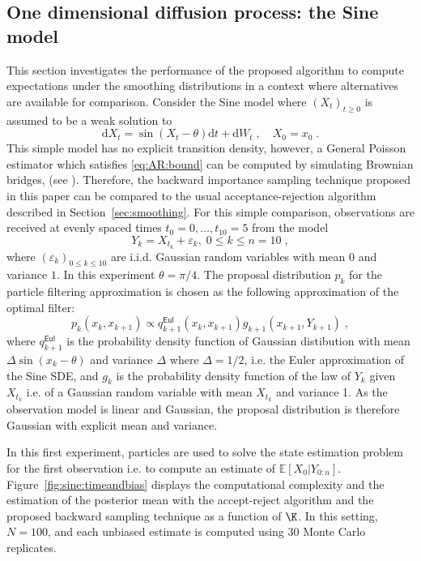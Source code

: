 \documentclass[12pt]{article}
\def\pE{\mathbb{E}}
\newcommand{\rmd}{\ensuremath{\mathrm{d}}}
\newcommand{\eqsp}{\;}
\begin{document}
\subsection{One dimensional diffusion process: the Sine model}
\label{sec:simu:SINE}
This section investigates the performance of the proposed algorithm to compute  expectations under the smoothing distributions in a context where  alternatives are available for comparison. Consider the Sine model where $(X_t)_{t\geqslant 0}$ is assumed to be a weak solution to
$$
\rmd X_t = \sin(X_t-\theta)\rmd t + \rmd W_t\eqsp,\quad X_0 = x_0\eqsp.
$$
This simple model has no explicit transition density, however, a General Poisson estimator which satisfies \eqref{eq:AR:bound} can be computed by simulating Brownian bridges, (see \cite{beskos2006exact}). 
Therefore, the backward importance sampling technique proposed in this paper can be compared to the usual acceptance-rejection algorithm described in Section~\ref{sec:smoothing}. 
For this simple comparison, observations are received at evenly spaced times $t_0=0,\ldots, t_{10} = 5$ from the model
\begin{equation}
\label{eq:obs:model:SINE}
Y_k=X_{t_k}+\varepsilon_k,\eqsp 0\leqslant k \leqslant n = 10\eqsp,
\end{equation}
where $(\varepsilon_k)_{0 \leqslant k\leqslant 10}$ are i.i.d. Gaussian random variables with mean $0$ and variance $1$. In this experiment $\theta = \pi/4$. 
The proposal distribution $p_k$ for the particle filtering approximation is chosen as the following approximation of the optimal filter:
\begin{equation}
\label{eq:optimal:filter}
p_{k}(x_{k},x_{k+1})\!\propto\! q^{\mathsf{Eul}}_{k+1}(x_{k},x_{k+1})g_{k+1}(x_{k+1},Y_{k+1})\eqsp,
\end{equation}
where $q^{\mathsf{Eul}}_{k+1}$ is the probability density function of Gaussian distibution with mean $\Delta \sin(x_k-\theta)$ and variance $\Delta$ where $\Delta = 1/2$, i.e. the Euler approximation of the Sine SDE, and $g_k$ is the probability density function of the law of $Y_k$ given $X_{t_k}$ i.e. of a Gaussian random variable with mean $X_{t_k}$ and variance 1. 
As the observation model is linear and Gaussian, the proposal distribution is therefore Gaussian with explicit mean and variance. 

In this first experiment, particles are used to solve the state estimation problem for the first observation i.e. to compute an estimate of $ \pE[ X_{0} | Y_{0:n}]$.
Figure~\ref{fig:sine:timeandbias} displays the computational complexity and the estimation of the posterior mean with the accept-reject algorithm and the proposed backward sampling technique as a function of $\K$. 
In this setting, $N=100$, and each unbiased estimate is computed using 30 Monte Carlo replicates.
\end{document}

